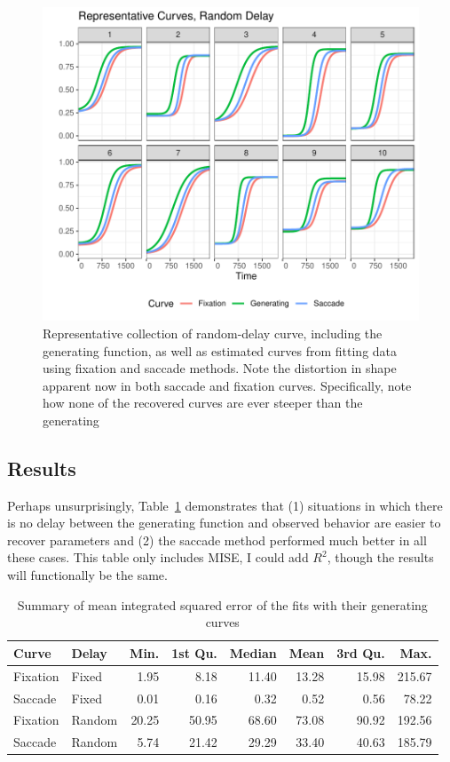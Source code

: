 \documentclass{article}
\begin{document}
\begin{figure}[H]
\centering
\includegraphics{random_pb_curves.pdf}
\caption{Representative collection of random-delay curve, including  the generating function, as well as estimated curves from fitting data using fixation and saccade methods. Note the distortion in shape apparent now in both saccade and fixation curves. Specifically, note how none of the recovered curves are ever steeper than the generating}
\label{fig:random_pb_curves}
\end{figure}

\subsection{Results}

Perhaps unsurprisingly, Table~\ref{tab:mise_fixed_delay} demonstrates that (1) situations in which there is no delay between the generating function and observed behavior are easier to recover parameters and (2) the saccade method performed much better in all these cases. This table only includes MISE, I could add $R^2$, though the results will functionally be the same.

\begin{table}[ht]
\centering
\begin{tabular}{llrrrrrr}
  \hline
Curve & Delay & Min. & 1st Qu. & Median & Mean & 3rd Qu. & Max. \\ 
  \hline
Fixation & Fixed & 1.95 & 8.18 & 11.40 & 13.28 & 15.98 & 215.67 \\ 
  Saccade & Fixed & 0.01 & 0.16 & 0.32 & 0.52 & 0.56 & 78.22 \\ 
  Fixation & Random & 20.25 & 50.95 & 68.60 & 73.08 & 90.92 & 192.56 \\ 
  Saccade & Random & 5.74 & 21.42 & 29.29 & 33.40 & 40.63 & 185.79 \\ 
   \hline
\end{tabular}
\caption{Summary of mean integrated squared error of the fits with their generating curves}
\label{tab:mise_fixed_delay}
\end{table}
\end{document}
